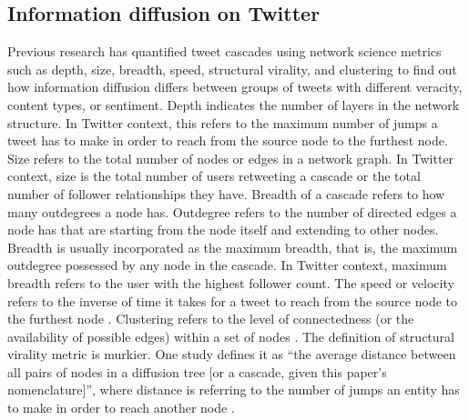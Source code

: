 \documentclass[11pt,a4paper]{article}
\begin{document}
    \subsection{Information diffusion on Twitter}
    Previous research has quantified tweet cascades using network science metrics such as depth, size, breadth, speed, structural virality, and clustering to find out how information diffusion differs between groups of tweets with different veracity, content types, or sentiment. Depth indicates the number of layers in the network structure. In Twitter context, this refers to the maximum number of jumps a tweet has to make in order to reach from the source node to the furthest node. Size refers to the total number of nodes or edges in a network graph. In Twitter context, size is the total number of users retweeting a cascade or the total number of follower relationships they have. Breadth of a cascade refers to how many outdegrees a node has. Outdegree refers to the number of directed edges a node has that are starting from the node itself and extending to other nodes. Breadth is usually incorporated as the maximum breadth, that is, the maximum outdegree possessed by any node in the cascade. In Twitter context, maximum breadth refers to the user with the highest follower count. The speed or velocity refers to the inverse of time it takes for a tweet to reach from the source node to the furthest node \cite{juul_comparing_2021}. Clustering refers to the level of connectedness (or the availability of possible edges) within a set of nodes \cite{pierri_topology_2020}. The definition of structural virality metric is murkier. One study defines it as \enquote{the average distance between all pairs of nodes in a diffusion tree [or a cascade, given this paper's nomenclature]}, where distance is referring to the number of jumps an entity has to make in order to reach another node \cite{goel_structural_2016}.
    
\end{document}
